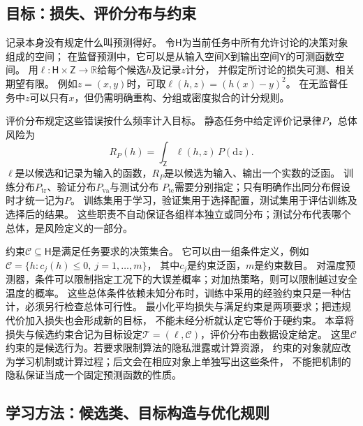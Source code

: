 \subsection{目标：损失、评价分布与约束}
\label{sec:future-learning-goal-objects}

记录本身没有规定什么叫预测得好。
令$\mathsf H$为当前任务中所有允许讨论的决策对象组成的空间；
在监督预测中，它可以是从输入空间$\mathsf X$到输出空间$\mathsf Y$的可测函数空间。
用$\ell:\mathsf H\times\mathsf Z\to\mathbb R$给每个候选$h$及记录$z$计分，
并假定所讨论的损失可测、相关期望有限。
例如$z=(x,y)$时，可取$\ell(h,z)=(h(x)-y)^2$。
在无监督任务中$z$可以只有$x$，但仍需明确重构、分组或密度拟合的计分规则。

评价分布规定这些错误按什么频率计入目标。
静态任务中给定评价记录律$P$，总体风险为
\begin{equation}
  R_P(h)=\int_{\mathsf Z}\ell(h,z)\,P(\mathrm dz).
  \label{eq:future-unified-population-risk}
\end{equation}
$\ell$是以候选和记录为输入的函数，$R_P$是以候选为输入、输出一个实数的泛函。
训练分布$P_{\mathrm{tr}}$、验证分布$P_{\mathrm{va}}$与测试分布
$P_{\mathrm{te}}$需要分别指定；只有明确作出同分布假设时才统一记为$P$。
训练集用于学习，验证集用于选择配置，测试集用于评估训练及选择后的结果。
这些职责不自动保证各组样本独立或同分布；测试分布代表哪个总体，是风险定义的一部分。

约束$\mathcal C\subseteq\mathsf H$是满足任务要求的决策集合。
它可以由一组条件定义，例如$\mathcal C=\{h:c_j(h)\leq0,\ j=1,\ldots,m\}$，
其中$c_j$是约束泛函，$m$是约束数目。
对温度预测器，条件可以限制指定工况下的大误差概率；对加热策略，则可以限制越过安全温度的概率。
这些总体条件依赖未知分布时，训练中采用的经验约束只是一种估计，必须另行检查总体可行性。
最小化平均损失与满足约束是两项要求；把违规代价加入损失也会形成新的目标，
不能未经分析就认定它等价于硬约束。
本章将损失与候选约束合记为目标设定$\mathcal T=(\ell,\mathcal C)$，评价分布由数据设定给定。
这里$\mathcal C$约束的是候选行为。若要求限制算法的隐私泄露或计算资源，
约束的对象就应改为学习机制或计算过程；后文会在相应对象上单独写出这些条件，
不能把机制的隐私保证当成一个固定预测函数的性质。

\subsection{学习方法：候选类、目标构造与优化规则}
\label{sec:future-learning-common-objects}
\label{sec:future-sampling-and-empirical-objective}
\label{sec:future-population-empirical-computation}

